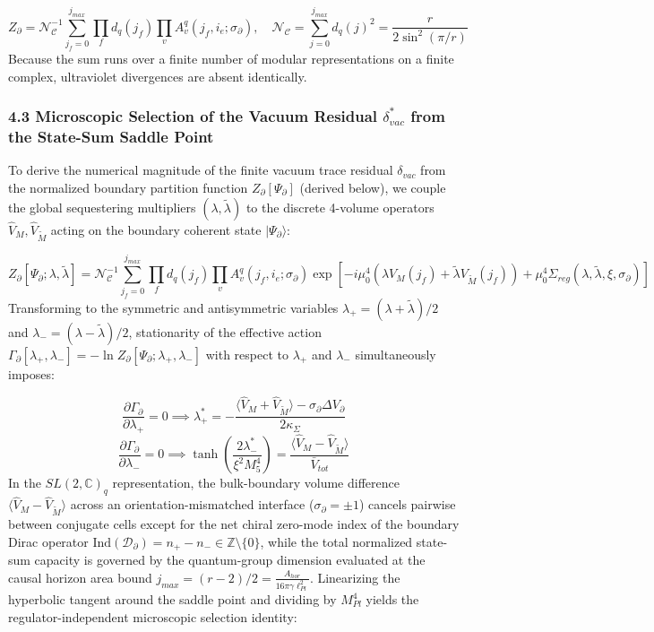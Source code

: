 \documentclass[aps,prd,onecolumn,superscriptaddress,nofootinbib,longbibliography,10pt]{revtex4-2}
\begin{document}
  \[ Z_\partial = \mathcal{N}_{\mathcal{C}}^{-1} \sum_{j_f=0}^{j_{max}} \prod_f d_q(j_f) \prod_v A_v^q(j_f, i_e; \sigma_\partial), \quad \mathcal{N}_{\mathcal{C}} = \sum_{j=0}^{j_{max}} d_q(j)^2 = \frac{r}{2\sin^2(\pi/r)} \]
  Because the sum runs over a finite number of modular representations on a finite complex, ultraviolet divergences are absent identically.



  
\subsubsection*{4.3 Microscopic Selection of the Vacuum Residual \(\delta_{vac}^*\) from the State-Sum Saddle Point}

  To derive the numerical magnitude of the finite vacuum trace residual \(\delta_{vac}\) from the normalized boundary partition function \(Z_\partial[\Psi_\partial]\) (derived below), we couple the global sequestering multipliers \((\lambda, \tilde{\lambda})\) to the discrete 4-volume operators \(\hat{V}_M, \hat{V}_{\tilde{M}}\) acting on the boundary coherent state \(|\Psi_\partial\rangle\):


  \[ Z_\partial[\Psi_\partial; \lambda, \tilde{\lambda}] = \mathcal{N}_{\mathcal{C}}^{-1} \sum_{j_f=0}^{j_{max}} \prod_f d_q(j_f) \prod_v A_v^q(j_f, i_e; \sigma_\partial) \exp\left[ -i\mu_0^4\left(\lambda V_M(j_f) + \tilde{\lambda} V_{\tilde{M}}(j_f)\right) + \mu_0^4\Sigma_{reg}(\lambda, \tilde{\lambda}, \xi, \sigma_\partial) \right] \]
  Transforming to the symmetric and antisymmetric variables \(\lambda_+ = (\lambda + \tilde{\lambda})/2\) and \(\lambda_- = (\lambda - \tilde{\lambda})/2\), stationarity of the effective action \(\Gamma_\partial[\lambda_+, \lambda_-] = -\ln Z_\partial[\Psi_\partial; \lambda_+, \lambda_-]\) with respect to \(\lambda_+\) and \(\lambda_-\) simultaneously imposes:


  \[ \frac{\partial\Gamma_\partial}{\partial\lambda_+} = 0 \implies \lambda_+^* = -\frac{\langle \hat{V}_M + \hat{V}_{\tilde{M}} \rangle - \sigma_\partial\Delta V_\partial}{2\kappa_\Sigma} \]
  \[ \frac{\partial\Gamma_\partial}{\partial\lambda_-} = 0 \implies \tanh\left(\frac{2\lambda_-^*}{\xi^2 M_5^4}\right) = \frac{\langle \hat{V}_M - \hat{V}_{\tilde{M}} \rangle}{\bar{V}_{tot}} \]
  In the \(SL(2,\mathbb{C})_q\) representation, the bulk-boundary volume difference \(\langle \hat{V}_M - \hat{V}_{\tilde{M}} \rangle\) across an orientation-mismatched interface (\(\sigma_\partial = \pm 1\)) cancels pairwise between conjugate cells except for the net chiral zero-mode index of the boundary Dirac operator \(\text{Ind}(\mathcal{D}_\partial) = n_+ - n_- \in \mathbb{Z}\setminus\{0\}\), while the total normalized state-sum capacity is governed by the quantum-group dimension evaluated at the causal horizon area bound \(j_{max} = (r-2)/2 = \frac{A_{hor}}{16\pi\gamma\ell_{Pl}^2}\). Linearizing the hyperbolic tangent around the saddle point and dividing by \(M_{Pl}^4\) yields the regulator-independent microscopic selection identity:
\end{document}
